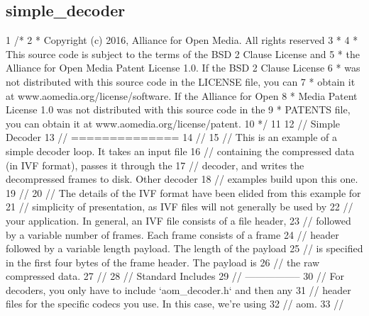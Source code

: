  \hypertarget{example_simple_decoder}{}\subsection{simple\+\_\+decoder}\label{example_simple_decoder}

\begin{DoxyCodeInclude}
1 \textcolor{comment}{/*}
2 \textcolor{comment}{ * Copyright (c) 2016, Alliance for Open Media. All rights reserved}
3 \textcolor{comment}{ *}
4 \textcolor{comment}{ * This source code is subject to the terms of the BSD 2 Clause License and}
5 \textcolor{comment}{ * the Alliance for Open Media Patent License 1.0. If the BSD 2 Clause License}
6 \textcolor{comment}{ * was not distributed with this source code in the LICENSE file, you can}
7 \textcolor{comment}{ * obtain it at www.aomedia.org/license/software. If the Alliance for Open}
8 \textcolor{comment}{ * Media Patent License 1.0 was not distributed with this source code in the}
9 \textcolor{comment}{ * PATENTS file, you can obtain it at www.aomedia.org/license/patent.}
10 \textcolor{comment}{ */}
11 
12 \textcolor{comment}{// Simple Decoder}
13 \textcolor{comment}{// ==============}
14 \textcolor{comment}{//}
15 \textcolor{comment}{// This is an example of a simple decoder loop. It takes an input file}
16 \textcolor{comment}{// containing the compressed data (in IVF format), passes it through the}
17 \textcolor{comment}{// decoder, and writes the decompressed frames to disk. Other decoder}
18 \textcolor{comment}{// examples build upon this one.}
19 \textcolor{comment}{//}
20 \textcolor{comment}{// The details of the IVF format have been elided from this example for}
21 \textcolor{comment}{// simplicity of presentation, as IVF files will not generally be used by}
22 \textcolor{comment}{// your application. In general, an IVF file consists of a file header,}
23 \textcolor{comment}{// followed by a variable number of frames. Each frame consists of a frame}
24 \textcolor{comment}{// header followed by a variable length payload. The length of the payload}
25 \textcolor{comment}{// is specified in the first four bytes of the frame header. The payload is}
26 \textcolor{comment}{// the raw compressed data.}
27 \textcolor{comment}{//}
28 \textcolor{comment}{// Standard Includes}
29 \textcolor{comment}{// -----------------}
30 \textcolor{comment}{// For decoders, you only have to include `aom\_decoder.h` and then any}
31 \textcolor{comment}{// header files for the specific codecs you use. In this case, we're using}
32 \textcolor{comment}{// aom.}
33 \textcolor{comment}{//}

\end{DoxyCodeInclude}
